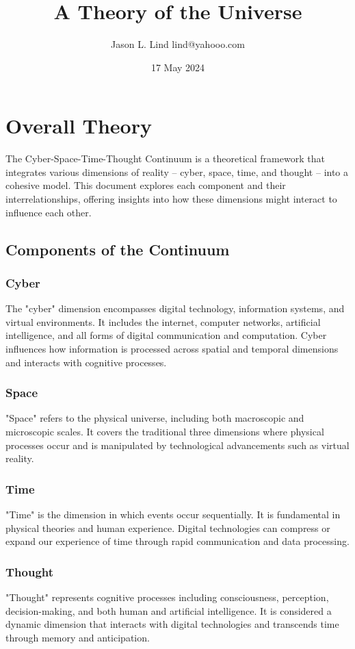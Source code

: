 \documentclass{article}
\begin{document}
\title{A Theory of the Universe}
\author{Jason L. Lind lind@yahooo.com}
\date{17 May 2024}
\maketitle
\section*{Overall Theory}
The Cyber-Space-Time-Thought Continuum is a theoretical framework that integrates various dimensions of reality -- cyber, space, time, and thought -- into a cohesive model. This document explores each component and their interrelationships, offering insights into how these dimensions might interact to influence each other.

\subsection{Components of the Continuum}
\subsubsection{Cyber}
The "cyber" dimension encompasses digital technology, information systems, and virtual environments. It includes the internet, computer networks, artificial intelligence, and all forms of digital communication and computation. Cyber influences how information is processed across spatial and temporal dimensions and interacts with cognitive processes.

\subsubsection{Space}
"Space" refers to the physical universe, including both macroscopic and microscopic scales. It covers the traditional three dimensions where physical processes occur and is manipulated by technological advancements such as virtual reality.

\subsubsection{Time}
"Time" is the dimension in which events occur sequentially. It is fundamental in physical theories and human experience. Digital technologies can compress or expand our experience of time through rapid communication and data processing.

\subsubsection{Thought}
"Thought" represents cognitive processes including consciousness, perception, decision-making, and both human and artificial intelligence. It is considered a dynamic dimension that interacts with digital technologies and transcends time through memory and anticipation.
\end{document}
